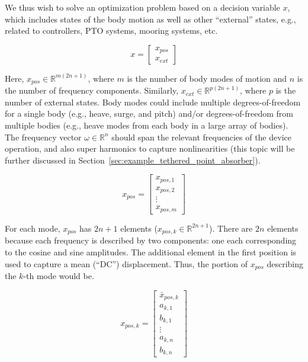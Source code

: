 \documentclass[]{article}
\begin{document}
We thus wish to solve an optimization problem based on a decision variable $x$, which includes states of the body motion as well as other ``external'' states, e.g., related to controllers, PTO systems, mooring systems, etc.

\begin{equation}\label{eq:decision_variable}
	x = 
	\begin{bmatrix}
		x_{pos}\\
		x_{ext}
	\end{bmatrix}
\end{equation}

\noindent{}Here, $x_{pos} \in \mathbb{R}^{m(2n + 1)}$, where $m$ is the number of body modes of motion and $n$ is the number of frequency components.
Similarly, $x_{ext} \in \mathbb{R}^{p(2n+1)}$, where $p$ is the number of external states.
Body modes could include multiple degrees-of-freedom for a single body (e.g., heave, surge, and pitch) and/or degrees-of-freedom from multiple bodies (e.g., heave modes from each body in a large array of bodies).
The frequency vector $\omega \in \mathbb{R}^n$ should span the relevant frequencies of the device operation, and also super harmonics to capture nonlinearities (this topic will be further discussed in Section~\ref{sec:example_tethered_point_absorber}).

\begin{equation}
	x_{pos} = 
	\begin{bmatrix}
		x_{pos,1} \\
		x_{pos,2} \\
		\vdots \\
		x_{pos,m}
	\end{bmatrix}
\end{equation}

For each mode, $x_{pos}$ has $2n + 1$ elements ($x_{pos,k} \in \mathbb{R}^{2n + 1}$).
There are $2n$ elements because each frequency is described by two components: one each corresponding to the cosine and sine amplitudes.
The additional element in the first position is used to capture a mean (``DC'') displacement.
Thus, the portion of $x_{pos}$ describing the $k$-th mode would be.

\begin{equation}
	x_{pos,k} = 
	\begin{bmatrix}
		\bar{x}_{pos,k} \\
		a_{k,1} \\
		b_{k,1} \\
		\vdots \\
		a_{k,n} \\
		b_{k,n}
	\end{bmatrix}
\end{equation}
\end{document}
